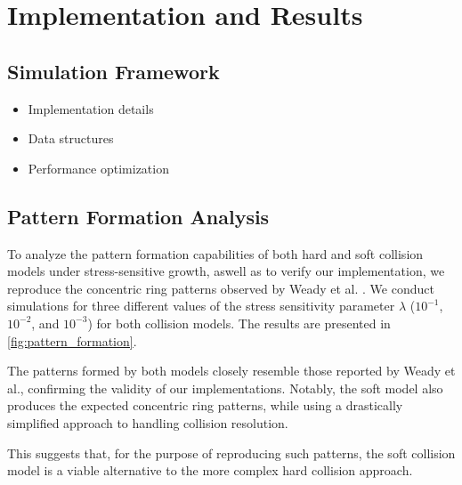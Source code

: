 \documentclass[conference]{IEEEtran}
\begin{document}
\newpage

\section{Implementation and Results}
\subsection{Simulation Framework}
\begin{itemize}
    \item Implementation details
    \item Data structures
    \item Performance optimization
\end{itemize}

\newpage

\subsection{Pattern Formation Analysis}

To analyze the pattern formation capabilities of both hard and soft collision models under stress-sensitive growth, aswell as to verify our implementation, we reproduce the concentric ring patterns observed by Weady et al. \cite{Weady2024}. We conduct simulations for three different values of the stress sensitivity parameter $\lambda$ ($10^{-1}$, $10^{-2}$, and $10^{-3}$) for both collision models. The results are presented in \autoref{fig:pattern_formation}.

The patterns formed by both models closely resemble those reported by Weady et al., confirming the validity of our implementations. Notably, the soft model also produces the expected concentric ring patterns, while using a drastically simplified approach to handling collision resolution.

This suggests that, for the purpose of reproducing such patterns, the soft collision model is a viable alternative to the more complex hard collision approach.
\end{document}
